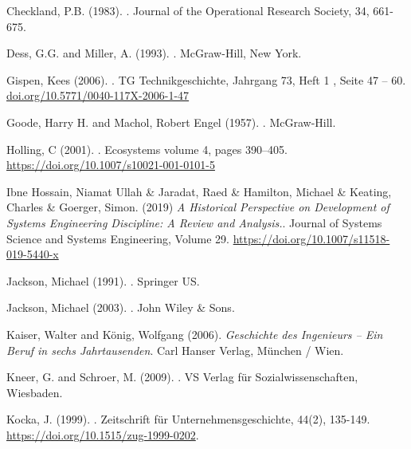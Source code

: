 \documentclass[a4paper,12pt]{article}
\begin{document}
\begin{thebibliography}{xxx}
 Checkland, P.B. (1983).  .  \newblock Journal of the
  Operational Research Society, 34, 661-675.

 Dess, G.G. and Miller, A. (1993).  .  \newblock McGraw-Hill, New York.

 Gispen, Kees (2006).  .  \newblock TG Technikgeschichte, Jahrgang 73, Heft 1 ,
  Seite 47 -- 60.  \newblock \url{doi.org/10.5771/0040-117X-2006-1-47}

 Goode, Harry H.  and Machol, Robert Engel (1957).
  .  \newblock McGraw-Hill.

 Holling, C (2001).  .  \newblock
  Ecosystems volume 4, pages 390–405.  \newblock
  \url{https://doi.org/10.1007/s10021-001-0101-5}

 Ibne Hossain, Niamat Ullah \& Jaradat, Raed \&
  Hamilton, Michael \& Keating, Charles \& Goerger, Simon. (2019) \newblock
  {\em A Historical Perspective on Development of Systems Engineering
    Discipline: A Review and Analysis.}.  \newblock Journal of Systems Science
  and Systems Engineering, Volume 29.  \newblock
  \url{https://doi.org/10.1007/s11518-019-5440-x}

 Jackson, Michael (1991).  .  \newblock Springer US.

 Jackson, Michael (2003).  .  \newblock John Wiley \& Sons.

 Kaiser, Walter and König, Wolfgang (2006).  \newblock
  {\em Geschichte des Ingenieurs -- Ein Beruf in sechs Jahrtausenden}.
  \newblock Carl Hanser Verlag, München / Wien.

 Kneer, G. and Schroer, M. (2009).  .  \newblock VS Verlag für
  Sozialwissenschaften, Wiesbaden.

 Kocka, J. (1999).  .
  \newblock Zeitschrift für Unternehmensgeschichte, 44(2), 135-149.  \newblock
  \url{https://doi.org/10.1515/zug-1999-0202}.


\end{thebibliography}
\end{document}
